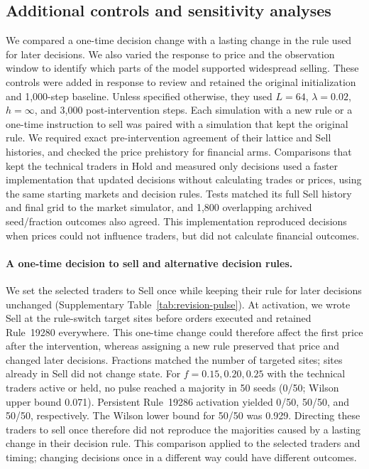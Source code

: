 \subsection{Additional controls and sensitivity analyses}
\label{app:revision-controls}

We compared a one-time decision change with a lasting change in the
rule used for later decisions. We also varied the response to price
and the observation window to identify which parts of the model
supported widespread selling. These controls were added in response to
review and retained the original initialization and 1,000-step baseline.
Unless specified otherwise, they used $L=64$, $\lambda=0.02$,
$h=\infty$, and 3,000 post-intervention steps. Each simulation with a new rule or a one-time instruction to sell was
paired with a simulation that kept the original rule. We required
exact pre-intervention agreement of their lattice and Sell histories,
and checked the price prehistory for financial arms. Comparisons that kept the technical traders in Hold and measured only decisions
used a faster implementation that updated decisions without calculating
trades or prices, using the same starting markets and decision rules. Tests matched
its full Sell history and final grid to the market simulator, and
1,800 overlapping archived seed/fraction outcomes also agreed. This implementation reproduced decisions when prices could not
influence traders, but did not calculate financial outcomes.

\paragraph{A one-time decision to sell and alternative decision rules.}
We set the selected traders to Sell once while keeping their rule for
later decisions unchanged
(Supplementary Table~\ref{tab:revision-pulse}). At activation, we wrote
Sell at the rule-switch target sites before orders executed and retained
Rule~19280 everywhere. This one-time change could therefore affect the first price after the
intervention, whereas assigning a new rule preserved that price and
changed later decisions. Fractions matched the number of targeted sites; sites
already in Sell did not change state. For $f=0.15,0.20,0.25$ with the
technical traders active or held, no pulse reached a majority in 50 seeds (0/50; Wilson
upper bound 0.071). Persistent Rule~19286 activation yielded 0/50,
50/50, and 50/50, respectively. The Wilson lower bound for 50/50
was 0.929. Directing these traders to sell once therefore did not reproduce the
majorities caused by a lasting change in their decision rule. This comparison applied to the selected traders and timing; changing
decisions once in a different way could have different outcomes.


